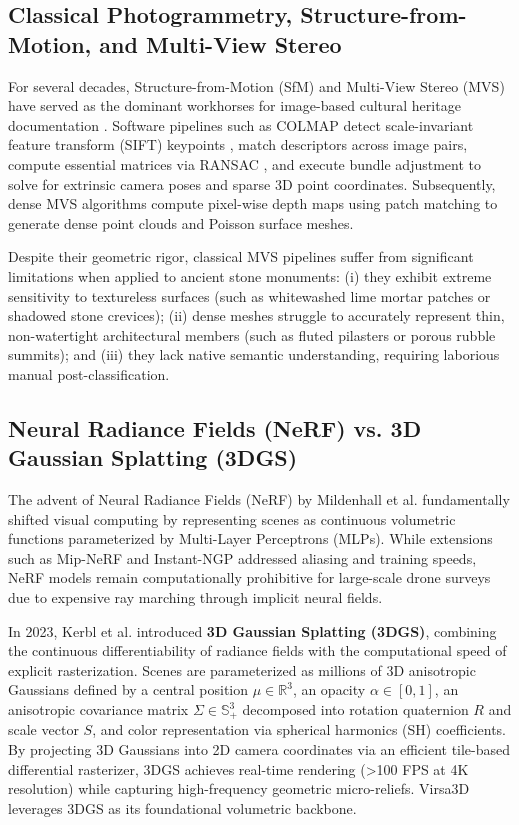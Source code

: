 \documentclass[11pt,a4paper]{article}
\begin{document}
\subsection{Classical Photogrammetry, Structure-from-Motion, and Multi-View Stereo}
For several decades, Structure-from-Motion (SfM) and Multi-View Stereo (MVS) have served as the dominant workhorses for image-based cultural heritage documentation \cite{schonberger2016structure, schonberger2016pixelwise, remondino2014heritage}. Software pipelines such as COLMAP \cite{schonberger2016structure} detect scale-invariant feature transform (SIFT) keypoints \cite{lowe2004distinctive}, match descriptors across image pairs, compute essential matrices via RANSAC \cite{fischler1981random}, and execute bundle adjustment to solve for extrinsic camera poses and sparse 3D point coordinates. Subsequently, dense MVS algorithms compute pixel-wise depth maps using patch matching to generate dense point clouds and Poisson surface meshes. 

Despite their geometric rigor, classical MVS pipelines suffer from significant limitations when applied to ancient stone monuments: (i) they exhibit extreme sensitivity to textureless surfaces (such as whitewashed lime mortar patches or shadowed stone crevices); (ii) dense meshes struggle to accurately represent thin, non-watertight architectural members (such as fluted pilasters or porous rubble summits); and (iii) they lack native semantic understanding, requiring laborious manual post-classification.

\subsection{Neural Radiance Fields (NeRF) vs. 3D Gaussian Splatting (3DGS)}
The advent of Neural Radiance Fields (NeRF) by Mildenhall et al. \cite{mildenhall2020nerf} fundamentally shifted visual computing by representing scenes as continuous volumetric functions parameterized by Multi-Layer Perceptrons (MLPs). While extensions such as Mip-NeRF \cite{barron2021mip} and Instant-NGP \cite{muller2022instant} addressed aliasing and training speeds, NeRF models remain computationally prohibitive for large-scale drone surveys due to expensive ray marching through implicit neural fields.

In 2023, Kerbl et al. \cite{kerbl20233d} introduced \textbf{3D Gaussian Splatting (3DGS)}, combining the continuous differentiability of radiance fields with the computational speed of explicit rasterization. Scenes are parameterized as millions of 3D anisotropic Gaussians defined by a central position $\mu \in \mathbb{R}^3$, an opacity $\alpha \in [0, 1]$, an anisotropic covariance matrix $\Sigma \in \mathbb{S}_+^3$ decomposed into rotation quaternion $R$ and scale vector $S$, and color representation via spherical harmonics (SH) coefficients. By projecting 3D Gaussians into 2D camera coordinates via an efficient tile-based differential rasterizer, 3DGS achieves real-time rendering (>100 FPS at 4K resolution) while capturing high-frequency geometric micro-reliefs. Virsa3D leverages 3DGS as its foundational volumetric backbone.
\end{document}
